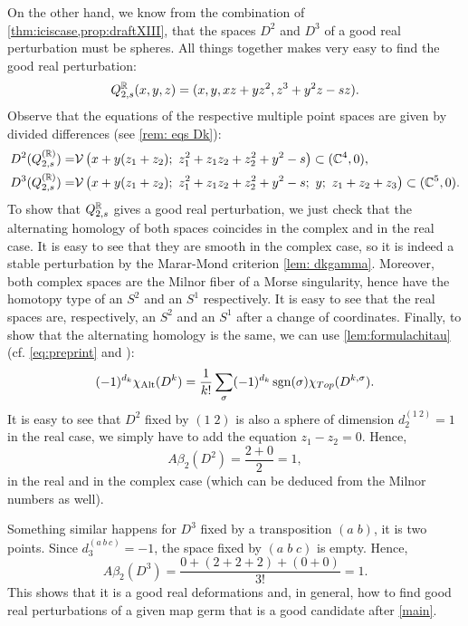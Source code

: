 \documentclass[a4paper,12pt]{amsart}
\begin{document}
On the other hand, we know from the combination of \cref{thm:iciscase,prop:draftXIII}, that the spaces $D^2$ and $D^3$ of a good real perturbation must be spheres. All things together makes very easy to find the good real perturbation:
\[Q_{2,s}^{\mathbb{R}}(x,y,z)=(x,y, xz+yz^2,z^3+y^2z-sz).\]
Observe that the equations of the respective multiple point spaces are given by divided differences (see \cref{rem: eqs Dk}):
\[\begin{aligned}
D^2(Q_{2,s}^{(\RR)})=&\Vcal\left( x+y(z_1+z_2);\ z_1^2+z_1z_2+z_2^2+y^2-s \right)\subset (\CC^4,0), \\
D^3(Q_{2,s}^{(\RR)})=&\Vcal\left( x+y(z_1+z_2);\ z_1^2+z_1z_2+z_2^2+y^2-s;\ y;\ z_1+z_2+z_3  \right)\subset (\CC^5,0).
\end{aligned}\]
To show that $Q_{2,s}^{\mathbb{R}}$ gives a good real perturbation, we just check that the alternating homology of both spaces coincides in the complex and in the real case.
It is easy to see that they are smooth in the complex case, so it is indeed a stable perturbation by the Marar-Mond criterion \cref{lem: dkgamma}. 
Moreover, both complex spaces are the Milnor fiber of a Morse singularity, hence have the homotopy type of an $S^2$ and an $S^1$ respectively. It is easy to see that the real spaces are, respectively, an $S^2$ and an $S^1$ after a change of coordinates.
Finally, to show that the alternating homology is the same, we can use \cref{lem:formulachitau} (cf. \cref{eq:preprint} and \cite[Theorem 4.7]{GimenezConejero2022c}):
\[(-1)^{d_k}\chi_{\textnormal{Alt}}(D^k)=\frac{1}{k!}\sum_\sigma(-1)^{d_k}\operatorname{sgn}(\sigma)\chi_{Top}(D^{k,\sigma}).\]
It is easy to see that $D^2$ fixed by $(1\; 2)$ is also a sphere of dimension $d_2^{(1\: 2)}=1$ in the real case, we simply have to add the equation $z_1-z_2=0$. Hence,
\[A\beta_2(D^2)=\frac{2+0}{2}=1,\]
in the real and in the complex case (which can be deduced from the Milnor numbers as well).

 Something similar happens for $D^3$ fixed by a transposition $(a\; b)$, it is two points. Since $d_3^{(a\: b\: c)}=-1$, the space fixed by $(a\; b\; c)$ is empty. Hence,
\[A\beta_2(D^3)=\frac{0+(2+2+2)+(0+0)}{3!}=1.\]
This shows that it is a good real deformations and, in general, how to find good real perturbations of a given map germ that is a good candidate after \cref{main}.
\end{document}
